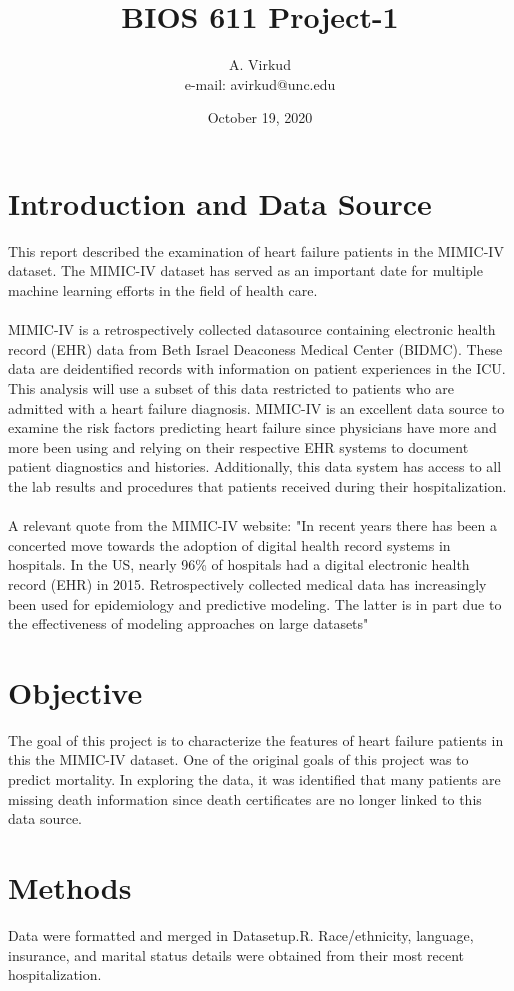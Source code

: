\documentclass{article}
\begin{document}
\title{BIOS 611 Project-1}
\author{A. Virkud \\ e-mail: avirkud@unc.edu}
\date{October 19, 2020}
\maketitle
\section{Introduction and Data Source}
This report described the examination of heart failure patients in the MIMIC-IV dataset. The MIMIC-IV dataset has served as an important date for multiple machine learning efforts in the field of health care.\\
\\
MIMIC-IV is a retrospectively collected datasource containing electronic health record (EHR) data from Beth Israel Deaconess Medical Center (BIDMC). These data are deidentified records with information on patient experiences in the ICU. This analysis will use a subset of this data restricted to patients who are admitted with a heart failure diagnosis. MIMIC-IV is an excellent data source to examine the risk factors predicting heart failure since physicians have more and more been using and relying on their respective EHR systems to document patient diagnostics and histories. Additionally, this data system has access to all the lab results and procedures that patients received during their hospitalization.\\
\\
A relevant quote from the MIMIC-IV website: "In recent years there has been a concerted move towards the adoption of digital health record systems in hospitals. In the US, nearly 96\% of hospitals had a digital electronic health record (EHR) in 2015. Retrospectively collected medical data has increasingly been used for epidemiology and predictive modeling. The latter is in part due to the effectiveness of modeling approaches on large datasets"
\section{Objective}
The goal of this project is to characterize the features of heart failure patients in this the MIMIC-IV dataset. One of the original goals of this project was to predict mortality. In exploring the data, it was identified that many patients are missing death information since death certificates are no longer linked to this data source. 
\section{Methods}
Data were formatted and merged in Datasetup.R. Race/ethnicity, language, insurance, and marital status details were obtained from their most recent hospitalization. 
\end{document}
